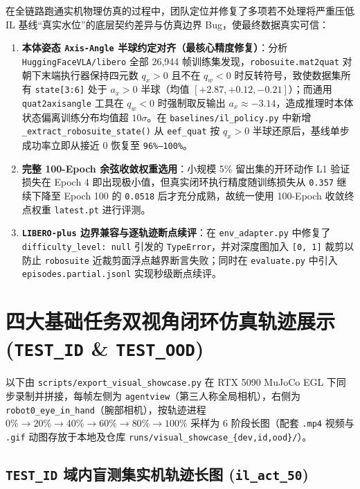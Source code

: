\documentclass[11pt,a4paper]{article}
\begin{document}
在全链路跑通实机物理仿真的过程中，团队定位并修复了多项若不处理将严重压低 IL 基线“真实水位”的底层契约差异与仿真边界 Bug，使最终数据真实可信：
\begin{enumerate}[leftmargin=1.6em,itemsep=3pt]
  \item \textbf{本体姿态 \texttt{Axis-Angle} 半球约定对齐（最核心精度修复）}：分析 \texttt{HuggingFaceVLA/libero} 全部 26,944 帧训练集发现，\texttt{robosuite.mat2quat} 对朝下末端执行器保持四元数 $q_x > 0$ 且不在 $q_w < 0$ 时反转符号，致使数据集所有 \texttt{state[3:6]} 处于 $a_x > 0$ 半球（均值 $[+2.87, +0.12, -0.21]$）；而通用 \texttt{quat2axisangle} 工具在 $q_w < 0$ 时强制取反输出 $a_x \approx -3.14$，造成推理时本体状态偏离训练分布均值超 $10\sigma$。在 \texttt{baselines/il\_policy.py} 中新增 \texttt{\_extract\_robosuite\_state()} 从 \texttt{eef\_quat} 按 $q_x > 0$ 半球还原后，基线单步成功率立即从接近 0 恢复至 \texttt{96\%--100\%}。
  \item \textbf{完整 100-Epoch 余弦收敛权重选用}：小规模 5\% 留出集的开环动作 L1 验证损失在 Epoch 4 即出现极小值，但真实闭环执行精度随训练损失从 \texttt{0.357} 继续下降至 Epoch 100 的 \texttt{0.0518} 后才充分成熟，故统一使用 100-Epoch 收敛终点权重 \texttt{latest.pt} 进行评测。
  \item \textbf{\texttt{LIBERO-plus} 边界兼容与逐轨迹断点续评}：在 \texttt{env\_adapter.py} 中修复了 \texttt{difficulty\_level: null} 引发的 \texttt{TypeError}，并对深度图加入 \texttt{[0, 1]} 裁剪以防止 \texttt{robosuite} 近裁剪面浮点越界断言失败；同时在 \texttt{evaluate.py} 中引入 \texttt{episodes.partial.jsonl} 实现秒级断点续评。
\end{enumerate}

\section{四大基础任务双视角闭环仿真轨迹展示 (\texttt{TEST\_ID} \& \texttt{TEST\_OOD})}

以下由 \texttt{scripts/export\_visual\_showcase.py} 在 RTX 5090 MuJoCo EGL 下同步录制并拼接，每帧左侧为 \texttt{agentview}（第三人称全局相机），右侧为 \texttt{robot0\_eye\_in\_hand}（腕部相机），按轨迹进程 $0\% \rightarrow 20\% \rightarrow 40\% \rightarrow 60\% \rightarrow 80\% \rightarrow 100\%$ 采样为 6 阶段长图（配套 \texttt{.mp4} 视频与 \texttt{.gif} 动图存放于本地及仓库 \texttt{runs/visual\_showcase\_\{dev,id,ood\}/}）。

\subsection{\texttt{TEST\_ID} 域内盲测集实机轨迹长图 (\texttt{il\_act\_50})}
\end{document}

